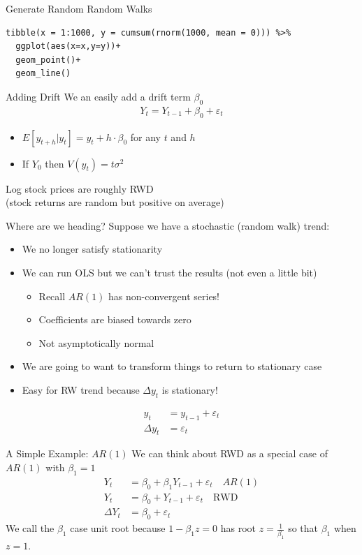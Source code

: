 \begin{frame}[fragile]{Generate Random Random Walks}
\begin{verbatim}
tibble(x = 1:1000, y = cumsum(rnorm(1000, mean = 0))) %>% 
  ggplot(aes(x=x,y=y))+
  geom_point()+
  geom_line()
\end{verbatim}
\end{frame}

\begin{frame}{Adding Drift}
We an easily add a drift term $\beta_0$
\begin{align*}
Y_t = Y_{t-1} + \beta_0 + \varepsilon_t
\end{align*}
\begin{itemize}
\item $E[y_{t+h} | y_t] = y_t + h\cdot \beta_0$ for any $t$ and $h$
\item If $Y_0$ then $V(y_t) = t \sigma^2$
\end{itemize}
Log stock prices are roughly RWD\\
(stock returns are random but positive on average)
\end{frame}

\begin{frame}{Where are we heading?}
Suppose we have a stochastic (random walk) trend:
\begin{itemize}
\item We no longer satisfy \alert{stationarity}
\item We can run OLS but we can't trust the results (not even a little bit)
\begin{itemize}
    \item Recall $AR(1)$ has non-convergent series!
    \item Coefficients are biased towards zero
    \item Not asymptotically normal
\end{itemize}
\item We are going to want to transform things to return to stationary case
\item Easy for RW trend because $\Delta y_t$ is stationary!
\end{itemize}
\begin{align*}
y_t &= y_{t-1} + \varepsilon_t \\
\Delta y_t &= \varepsilon_t
\end{align*}
\end{frame}


\begin{frame}{A Simple Example: $AR(1)$}
We can think about RWD as a special case of $AR(1)$ with $\beta_1=1$
\begin{align*}
Y_t  &= \beta_0 +\beta_1 Y_{t-1} + \varepsilon_t \quad AR(1)\\
Y_t  &= \beta_0 + Y_{t-1} + \varepsilon_t \quad  \text{RWD} \\
\Delta Y_t  &= \beta_0 + \varepsilon_t 
\end{align*}
We call the $\beta_1$ case \alert{unit root} because $1 - \beta_1 z=0$ has root $z = \frac{1}{\beta_1}$ so that $\beta_1$ when $z=1$.
\end{frame}

